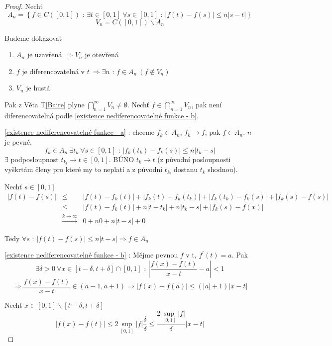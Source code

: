 \begin{proof}
Nechť 
$$A_n = \left\{ f \in C([0,1]) \textrm{ : } \exists t \in [0,1] \ \forall s \in [0,1]  \textrm{ : } |f(t)-f(s)| \leq n |s-t| \right\}$$
$$V_n = C([0,1]) \backslash A_n$$

Budeme dokazovat
\begin{enumerate}
\item \label{existence nediferencovatelné funkce - a} $A_n$ je uzavřená $\Rightarrow V_n$ je otevřená
\item \label{existence nediferencovatelné funkce - b} $f$ je diferencovatelná v $t \ \Rightarrow \exists n \textrm{ : } f \in A_n \ (f \notin V_n)$
\item \label{existence nediferencovatelné funkce - c} $V_n$ je hustá
\end{enumerate}

Pak z Věta T\ref{Baire} plyne $\bigcap_{n=1}^\infty V_n \neq \emptyset$. Nechť $f \in \bigcap_{n=1}^\infty V_n$, pak není diferencovatelná podle \ref{existence nediferencovatelné funkce - b}.

\ref{existence nediferencovatelné funkce - a} : chceme $f_k \in A_n$, $f_k \to f$, pak $f \in A_n$. $n$ je pevné.
$$f_k \in A_n \ \exists t_k \ \forall s \in [0,1] \textrm{ : } |f_k(t_k) - f_k(s)| \leq n |t_k-s|$$
$\exists$ podposloupnost $t_{k_l} \to t \in [0,1]$. BÚNO $t_k \to t$ (z původní posloupnosti vyškrtám členy pro které my to neplatí a z původní $t_{k_l}$ dostanu $t_k$ shodnou).

Nechť $s \in [0,1]$
\begin{eqnarray*}
|f(t)-f(s)| & \leq & |f(t)-f_k(t)|+|f_k(t)-f_k(t_k)|+|f_k(t_k)-f_k(s)|+|f_k(s)-f(s)| \\
& \leq & |f(t)-f_k(t)|+n|t-t_k| + n|t_k-s|+|f_k(s)-f(x)| \\
& \overset{k \to \infty}{\to} & 0 + n0 + n|t-s|+0
\end{eqnarray*}

Tedy $\forall s \textrm{ : } |f(t)-f(s)| \leq n|t-s| \Rightarrow f \in A_n$

\ref{existence nediferencovatelné funkce - b} : Mějme pevnou $f$ v t, $f^\prime(t)=a$. Pak 
$$\exists \delta > 0 \ \forall x \in [t-\delta, t+\delta] \cap [0,1] \textrm{ : } \left| \frac{f(x)-f(t)}{x-t} - a \right| < 1 $$
$$\Rightarrow \frac{f(x)-f(t)}{x-t} \in (a-1,a+1) \Rightarrow |f(x)-f(a)| \leq (|a|+1)|x-t|$$

Nechť $x \in [0,1] \backslash [t-\delta,t+\delta]$
$$|f(x)-f(t)| \leq 2 \sup_{[0,1]} |f| \frac{\delta}{\delta} \leq \frac{2 \sup_{[0,1]} |f|}{\delta} |x-t|$$


\end{proof}
